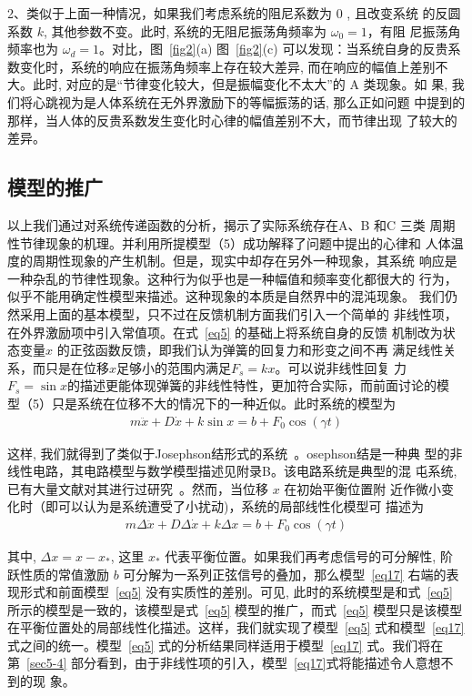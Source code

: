 \documentclass[withoutpreface,bwprint]{cumcmthesis} %
\begin{document}
2、类似于上面一种情况，如果我们考虑系统的阻尼系数为 0 , 且改变系统 的反圆系数 $ k$, 其他参数不变。此时, 系统的无阻尼振荡角频率为  $\omega_{0}=1  $，有阻 尼振荡角频率也为 $ \omega_{d}=1  $。对比，图~\ref{fig2}(a)  图~\ref{fig2}(c)  可以发现：当系统自身的反贵系 数变化时，系统的响应在振荡角频率上存在较大差异, 而在响应的幅值上差别不 大。此时, 对应的是“节律变化较大，但是振幅变化不太大”的 A 类现象。如 果, 我们将心跳视为是人体系统在无外界激励下的等幅振荡的话, 那么正如问题 中提到的那样，当人体的反贵系数发生变化时心律的幅值差别不大，而节律出现 了较大的差异。

\subsection{模型的推广}
\label{sec4-3}

以上我们通过对系统传递函数的分析，揭示了实际系统存在A、B 和C 三类
周期性节律现象的机理。并利用所提模型（5）成功解释了问题中提出的心律和
人体温度的周期性现象的产生机制。但是，现实中却存在另外一种现象，其系统
响应是一种杂乱的节律性现象。这种行为似乎也是一种幅值和频率变化都很大的
行为，似乎不能用确定性模型来描述。这种现象的本质是自然界中的混沌现象。
我们仍然采用上面的基本模型，只不过在反馈机制方面我们引入一个简单的
非线性项，在外界激励项中引入常值项。在式~\eqref{eq5} 的基础上将系统自身的反馈
机制改为状态变量$x$ 的正弦函数反馈，即我们认为弹簧的回复力和形变之间不再
满足线性关系，而只是在位移$x $足够小的范围内满足$ F_s = kx$。可以说非线性回复
力$F_s=\sin x$的描述更能体现弹簧的非线性特性，更加符合实际，而前面讨论的模
型（5）只是系统在位移不大的情况下的一种近似。此时系统的模型为
\begin{align}
\label{eq16}
m \ddot{x}+D \dot{x}+k \sin x=b+F_{0} \cos (\gamma t)
\end{align}

这样, 我们就得到了类似于Josephson结形式的系统~。osephson结是一种典 型的非线性电路，其电路模型与数学模型描述见附录B。该电路系统是典型的混 屯系统, 已有大量文献对其进行过研究~。然而，当位移 $ x $ 在初始平衡位置附 近作微小变化时（即可以认为是系统遭受了小扰动)，系统的局部线性化模型可 描述为
\begin{align}
\label{eq17}
m \Delta \ddot{x}+D \Delta \dot{x}+k \Delta x=b+F_{0} \cos (\gamma t)
\end{align}

其中,  $\Delta x=x-x_{*} $, 这里 $ x_{*}$  代表平衡位置。如果我们再考虑信号的可分解性, 阶 跃性质的常值激励 $ b $ 可分解为一系列正弦信号的叠加，那么模型~\eqref{eq17} 右端的表 现形式和前面模型~\eqref{eq5} 没有实质性的差别。可见, 此时的系统模型是和式~\eqref{eq5} 所示的模型是一致的，该模型是式~\eqref{eq5} 模型的推广，而式~\eqref{eq5} 模型只是该模型 在平衡位置处的局部线性化描述。这样，我们就实现了模型~\eqref{eq5} 式和模型~\eqref{eq17} 式之间的统一。模型~\eqref{eq5} 式的分析结果同样适用于模型~\eqref{eq17} 式。我们将在第~\ref{sec5-4}
 部分看到，由于非线性项的引入，模型~\eqref{eq17}式将能描述令人意想不到的现
象。
\end{document}
